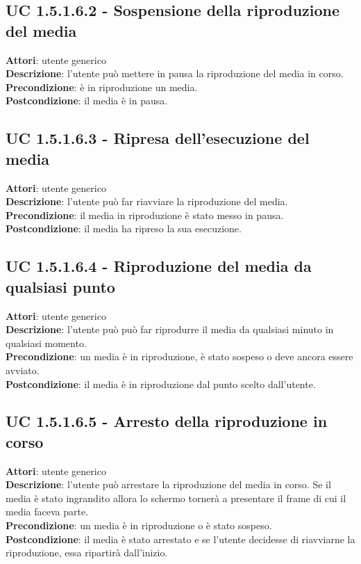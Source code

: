 	\subsection{UC 1.5.1.6.2 - Sospensione della riproduzione del media}{
		\label{uc1.5.1.6.2}
		\textbf{Attori}: utente generico \\
		\textbf{Descrizione}: l'utente può mettere in pausa la riproduzione del media in corso. \\
		\textbf{Precondizione}: è in riproduzione un media.	\\
		\textbf{Postcondizione}: il media è in pausa.	\\
	}
	\subsection{UC 1.5.1.6.3 - Ripresa dell'esecuzione del media}{
		\label{uc1.5.1.6.3}
		\textbf{Attori}: utente generico \\
		\textbf{Descrizione}: l'utente può far riavviare la riproduzione del media. \\
		\textbf{Precondizione}: il media in riproduzione è stato messo in pausa.	\\
		\textbf{Postcondizione}: il media ha ripreso la sua esecuzione.	\\
	}
	\subsection{UC 1.5.1.6.4 - Riproduzione del media da qualsiasi punto}{
		\label{uc1.5.1.6.4}
		\textbf{Attori}: utente generico \\
		\textbf{Descrizione}: l'utente può può far riprodurre il media da qualsiasi minuto in qualsiasi momento. \\
		\textbf{Precondizione}: un media è in riproduzione, è stato sospeso o deve ancora essere avviato.	\\
		\textbf{Postcondizione}: il media è in riproduzione dal punto scelto dall'utente.	\\
	}
	\subsection{UC 1.5.1.6.5 - Arresto della riproduzione in corso}{
		\label{uc1.5.1.6.5}
		\textbf{Attori}: utente generico \\
		\textbf{Descrizione}: l'utente può arrestare la riproduzione del media in corso. Se il media è stato ingrandito allora lo schermo tornerà a presentare il frame di cui il media faceva parte. \\
		\textbf{Precondizione}: un media è in riproduzione o è stato sospeso.	\\
		\textbf{Postcondizione}: il media è stato arrestato e se l'utente decidesse di riavviarne la riproduzione, essa ripartirà dall'inizio.	\\
	}
